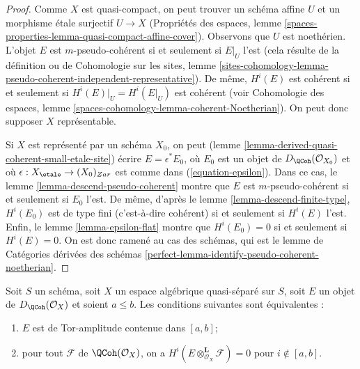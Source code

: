 \begin{proof}
Comme $X$ est quasi-compact, on peut trouver un sch\'ema affine $U$ et un
morphisme \'etale surjectif $U \to X$ (Propri\'et\'es des espaces, lemme
\ref{spaces-properties-lemma-quasi-compact-affine-cover}).
Observons que $U$ est noeth\'erien. L'objet $E$ est $m$-pseudo-coh\'erent si et
seulement si $E|_U$ l'est (cela r\'esulte de la d\'efinition ou de Cohomologie
sur les sites, lemme
\ref{sites-cohomology-lemma-pseudo-coherent-independent-representative}).
De m\^eme, $H^i(E)$ est coh\'erent si et seulement si
$H^i(E)|_U=H^i(E|_U)$ est coh\'erent (voir Cohomologie des espaces, lemme
\ref{spaces-cohomology-lemma-coherent-Noetherian}).
On peut donc supposer $X$ repr\'esentable.

\medskip\noindent
Si $X$ est repr\'esent\'e par un sch\'ema $X_0$, on peut (lemme
\ref{lemma-derived-quasi-coherent-small-etale-site}) \'ecrire
$E=\epsilon^*E_0$, o\`u $E_0$ est un objet de
$D_\QCoh(\mathcal{O}_{X_0})$ et o\`u
$\epsilon : X_\etale \to (X_0)_{Zar}$ est comme dans
(\ref{equation-epsilon}). Dans ce cas, le lemme
\ref{lemma-descend-pseudo-coherent} montre que $E$ est
$m$-pseudo-coh\'erent si et seulement si $E_0$ l'est. De m\^eme, d'apr\`es le
lemme \ref{lemma-descend-finite-type}, $H^i(E_0)$ est de type fini (c'est-\`a-dire
coh\'erent) si et seulement si $H^i(E)$ l'est. Enfin, le lemme
\ref{lemma-epsilon-flat} montre que $H^i(E_0)=0$ si et seulement si
$H^i(E)=0$. On est donc ramen\'e au cas des sch\'emas, qui est le lemme de
Cat\'egories d\'eriv\'ees des sch\'emas
\ref{perfect-lemma-identify-pseudo-coherent-noetherian}.
\end{proof}

\begin{lemma}
\label{lemma-tor-qc-qs}
Soit $S$ un sch\'ema, soit $X$ un espace alg\'ebrique quasi-s\'epar\'e sur $S$,
soit $E$ un objet de $D_\QCoh(\mathcal{O}_X)$ et soient $a \leq b$.
Les conditions suivantes sont \'equivalentes :
\begin{enumerate}
\item $E$ est de Tor-amplitude contenue dans $[a,b]$;
\item pour tout $\mathcal{F}$ de $\QCoh(\mathcal{O}_X)$, on a
$H^i(E \otimes_{\mathcal{O}_X}^\mathbf{L} \mathcal{F})=0$ pour
$i \notin [a,b]$.
\end{enumerate}
\end{lemma}

